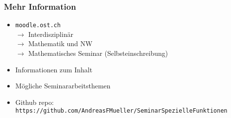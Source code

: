 %
%
%
\bgroup
\begin{frame}[t]
\setlength{\abovedisplayskip}{5pt}
\setlength{\belowdisplayskip}{5pt}
\frametitle{Mehr Information}
\begin{itemize}
\item \texttt{moodle.ost.ch}\\
$\rightarrow$ Interdisziplinär\\
$\rightarrow$ Mathematik und NW\\
$\rightarrow$ Mathematisches Seminar
(Selbsteinschreibung)
\item Informationen zum Inhalt
\item Mögliche Seminararbeitsthemen
\item Github repo: \texttt{https://github.com/AndreasFMueller/SeminarSpezielleFunktionen}
\end{itemize}
\end{frame}
\egroup
